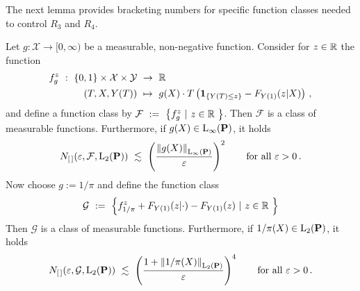 The next lemma provides bracketing numbers for specific function classes needed to control $R_3$ and $R_4$.
\newpage
\begin{lemma}
    \label{lem:brack_n}
  Let
  $
  g
  :
  \mathcal{X}\to [0,\infty)
  $
  be a measurable, non-negative function.
  Consider for $z\in\R$ the function
  \begin{align*}
    f_{g}^z
    \ 
    :
    \ 
      \left\{ 0,1 \right\}
      \times
      \mathcal{X}
      \times
      \mathcal{Y}
    &
    \ 
    \to
    \ 
    \R
    \\
      (T,X,Y(T))
    &
      \ 
      \mapsto
      \ 
      g(X)
      \cdot
      T
      \left( 
        \mathbf{1}
        _{\left\{ Y(T)\le z \right\}}
        -
        F_{Y(1)}(z|X)
      \right)
      \,,
  \end{align*}
  and define a function class by
  $
    \mathcal{F}
    \ 
    :=
    \ 
    \left\{ 
      f_{g}^z
      \ 
      |
      \ 
      z\in\R\ 
    \right\}
  $.
  Then $\mathcal{F}$ is a class of measurable functions. 
  Furthermore, if $g(X)\in\mathrm{L}_\infty(\P)$, it holds 
  \begin{gather*}
    N_{[\,]}
    (
    \varepsilon
    ,
    \mathcal{F},\mathrm{L}_2(\P))
    \ 
    \lesssim
    \ 
    \left( 
    \frac{\norm{g(X)}_{\mathrm{L}_\infty(\P)}}{\varepsilon}
    \right)^2
    \qquad
    \text{for all}
    \ 
    \varepsilon>0
    \,.
  \end{gather*}
  Now choose $g:=1/\pi$ and define the function class
  \begin{gather*}
    \mathcal{G}
    \ 
    :=
    \ 
    \left\{ 
      f_{1/\pi}^z
      +
      F_{Y(1)}(z|\cdot)
      -
      F_{Y(1)}(z)
      \ 
      |
      \ 
      z\in\R\ 
    \right\}
  \end{gather*}
  Then $\mathcal{G}$ is a class of measurable functions. 
  Furthermore, if $1/\pi(X)\in\mathrm{L}_2(\P)$, it holds 
  \begin{gather*}
    N_{[\,]}
    (
    \varepsilon
    ,
    \mathcal{G},\mathrm{L}_2(\P))
    \ 
    \lesssim
    \ 
    \left( 
    \frac{
      1+
    \norm{1/\pi(X)}_{\mathrm{L}_2(\P)}
    }
    {\varepsilon}
    \right)^4
    \qquad
    \text{for all}
    \ 
    \varepsilon>0
    \,.
  \end{gather*}
\end{lemma}
